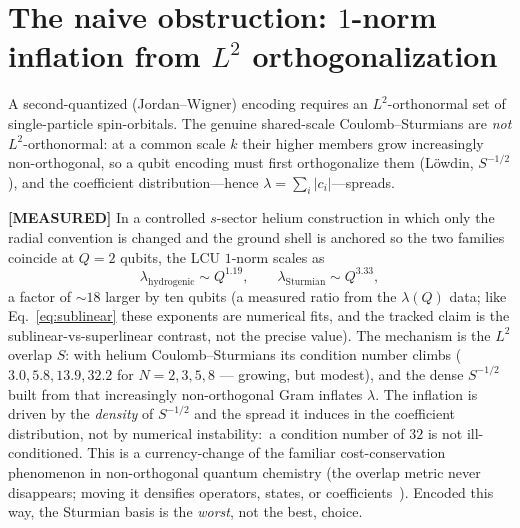 \documentclass[aps,pra,twocolumn,superscriptaddress,longbibliography]{revtex4-2}
\newcommand{\gvq}[2]{#2}
\begin{document}
\section{The naive obstruction: $1$-norm inflation from $L^2$ orthogonalization}
\label{sec:obstruction}

A second-quantized (Jordan--Wigner) encoding requires an $L^2$-orthonormal set of
single-particle spin-orbitals.  The genuine shared-scale Coulomb--Sturmians are
\emph{not} $L^2$-orthonormal: at a common scale $k$ their higher members grow
increasingly non-orthogonal, so a qubit encoding must first orthogonalize them (L\"owdin,
$S^{-1/2}$), and the coefficient distribution---hence
$\lambda=\sum_i|c_i|$---spreads.

\textbf{[MEASURED]} In a controlled $s$-sector helium construction in which only
the radial convention is changed and the ground shell is anchored so the two
families coincide at $Q=2$ qubits, the LCU $1$-norm scales as
\begin{equation}
\lambda_{\text{hydrogenic}}\sim Q^{\gvq{p60_l2_inflation_hydrogenic}{1.19}},
\qquad
\lambda_{\text{Sturmian}}\sim Q^{\gvq{p60_l2_inflation_sturmian}{3.33}},
\label{eq:blowup}
\end{equation}
a factor of $\sim\!18$ larger by ten qubits (a measured ratio from the
$\lambda(Q)$ data; like Eq.~\eqref{eq:sublinear} these exponents are numerical
fits, and the tracked claim is the sublinear-vs-superlinear contrast, not the
precise value).  The mechanism is the
$L^2$ overlap $S$: with helium Coulomb--Sturmians its condition number climbs
($3.0,5.8,13.9,32.2$ for $N=2,3,5,8$ --- growing, but modest), and the dense
$S^{-1/2}$ built from that increasingly non-orthogonal Gram inflates
$\lambda$.  The inflation is driven by the \emph{density} of $S^{-1/2}$ and the
spread it induces in the coefficient distribution, not by numerical
instability:\ a condition number of $32$ is not ill-conditioned.  This is a currency-change of the
familiar cost-conservation phenomenon in non-orthogonal quantum chemistry (the
overlap metric never disappears; moving it densifies operators, states, or
coefficients~\cite{loutey_paper58}).  Encoded this way, the Sturmian basis is the
\emph{worst}, not the best, choice.
\end{document}
